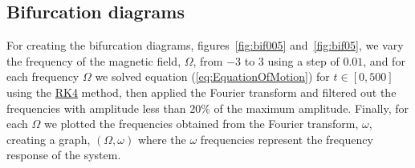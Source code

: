 \subsection{Bifurcation diagrams}

For creating the bifurcation diagrams, figures~\ref{fig:bif005} and~\ref{fig:bif05}, we vary the frequency of the magnetic field, $\Omega$, from $-3$ to $3$ using a step of $0.01$, and for each frequency $\Omega$ we solved equation (\ref{eq:EquationOfMotion}) for $t \in [0,500]$ using the \hyperref[sec:RK4]{RK4} method, then applied the Fourier transform and filtered out the frequencies with amplitude less than $20\%$ of the maximum amplitude. Finally, for each $\Omega$ we plotted the frequencies obtained from the Fourier transform, $\omega$, creating a graph, $(\Omega,\omega)$ where the $\omega$ frequencies represent the frequency response of the system.  

